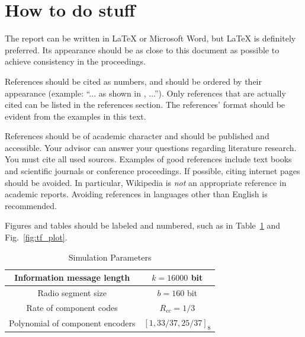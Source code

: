 \documentclass[journal, a4paper]{IEEEtran}
\begin{document}
\section{How to do stuff}
    The report can be written in \LaTeX{} or Microsoft Word, but \LaTeX{} is definitely preferred.
    Its appearance should be as close to this document as possible to achieve consistency in the proceedings.

    References should be cited as numbers, and should be ordered by their appearance (example: ``... as shown in \cite{HOP96}, ...'').
    Only references that are actually cited can be listed in the references section.
    The references' format should be evident from the examples in this text.

    References should be of academic character and should be published and accessible.
    Your advisor can answer your questions regarding literature research.
    You must cite all used sources.
    Examples of good references include text books and scientific journals or conference proceedings.
    If possible, citing internet pages should be avoided. In particular, Wikipedia is \emph{not} an appropriate reference in academic reports.
    Avoiding references in languages other than English is recommended.

    Figures and tables should be labeled and numbered, such as in Table~\ref{tab:simParameters} and Fig.~\ref{fig:tf_plot}.

    \begin{table}[!hbt]
        \begin{center}
        \caption{Simulation Parameters}
        \label{tab:simParameters}
        \begin{tabular}{|c|c|}
            \hline
            Information message length & $k=16000$ bit \\
            \hline
            Radio segment size & $b=160$ bit \\
            \hline
            Rate of component codes & $R_{cc}=1/3$\\
            \hline
            Polynomial of component encoders & $[1 , 33/37 , 25/37]_8$\\
            \hline
        \end{tabular}
        \end{center}
    \end{table}
\end{document}
